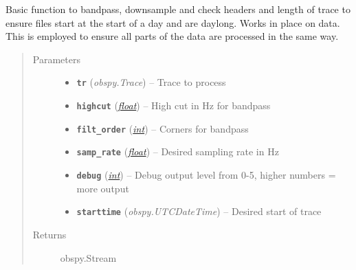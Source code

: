 \documentclass[a4paper,10pt,english]{sphinxmanual}
\begin{document}
\begin{fulllineitems}
\label{utils:pre_processing.dayproc}
Basic function to bandpass, downsample and check headers and length of trace
to ensure files start at the start of a day and are daylong.  Works in place
on data.  This is employed to ensure all parts of the data are processed
in the same way.
\begin{quote}\begin{description}
\item[{Parameters}] \leavevmode\begin{itemize}
\item {} 
\textbf{\texttt{tr}} (\emph{obspy.Trace}) -- Trace to process

\item {} 
\textbf{\texttt{highcut}} (\href{https://docs.python.org/library/functions.html\#float}{\emph{float}}) -- High cut in Hz for bandpass

\item {} 
\textbf{\texttt{filt\_order}} (\href{https://docs.python.org/library/functions.html\#int}{\emph{int}}) -- Corners for bandpass

\item {} 
\textbf{\texttt{samp\_rate}} (\href{https://docs.python.org/library/functions.html\#float}{\emph{float}}) -- Desired sampling rate in Hz

\item {} 
\textbf{\texttt{debug}} (\href{https://docs.python.org/library/functions.html\#int}{\emph{int}}) -- Debug output level from 0-5, higher numbers = more output

\item {} 
\textbf{\texttt{starttime}} (\emph{obspy.UTCDateTime}) -- Desired start of trace

\end{itemize}

\item[{Returns}] \leavevmode
obspy.Stream

\end{description}\end{quote}

\end{fulllineitems}

\end{document}
